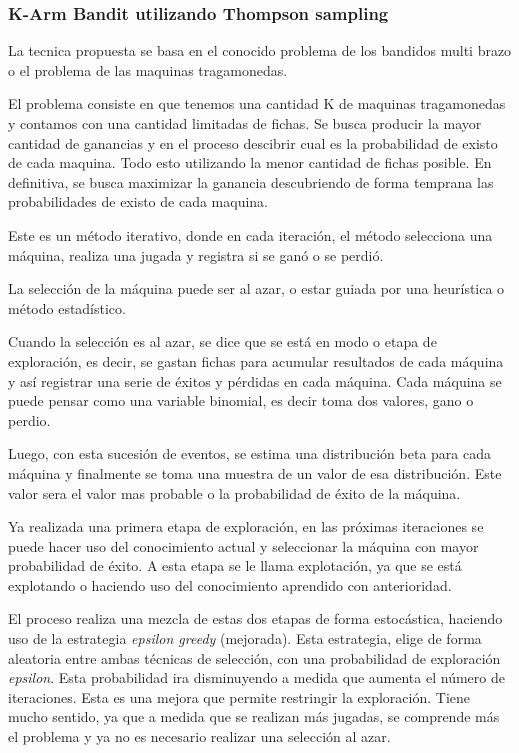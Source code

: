 \documentclass[11pt,a4paper,twoside]{thesis}
\begin{document}
\subsubsection{K-Arm Bandit utilizando Thompson sampling}

La tecnica propuesta se basa en el conocido problema de los bandidos multi
brazo o el problema de las maquinas tragamonedas.

El problema consiste en que tenemos una cantidad K de maquinas tragamonedas y
contamos con una cantidad limitadas de fichas. Se busca producir la mayor
cantidad de ganancias y en el proceso descibrir cual es la probabilidad de
existo de cada maquina. Todo esto utilizando la menor cantidad de fichas
posible. En definitiva, se busca maximizar la ganancia descubriendo de forma
temprana las probabilidades de existo de cada maquina.

Este es un método iterativo, donde en cada iteración, el método selecciona una
máquina, realiza una jugada y registra si se ganó o se perdió.

La selección de la máquina puede ser al azar, o estar guiada por una heurística
o método estadístico.

Cuando la selección es al azar, se dice que se está en modo o etapa de
exploración, es decir, se gastan fichas para acumular resultados de cada
máquina y así registrar una serie de éxitos y pérdidas en cada máquina. Cada
máquina se puede pensar como una variable binomial, es decir toma dos valores,
gano o perdio.

Luego, con esta sucesión de eventos, se estima una distribución beta para cada
máquina y finalmente se toma una muestra de un valor de esa distribución. Este
valor sera el valor mas probable o la probabilidad de éxito de la máquina.

Ya realizada una primera etapa de exploración, en las próximas iteraciones se
puede hacer uso del conocimiento actual y seleccionar la máquina con mayor
probabilidad de éxito. A esta etapa se le llama explotación, ya que se está
explotando o haciendo uso del conocimiento aprendido con anterioridad.

El proceso realiza una mezcla de estas dos etapas de forma estocástica,
haciendo uso de la estrategia \textit{epsilon greedy} (mejorada). Esta
estrategia, elige de forma aleatoria entre ambas técnicas de selección, con una
probabilidad de exploración \textit{epsilon}. Esta probabilidad ira
disminuyendo a medida que aumenta el número de iteraciones. Esta es una mejora
que permite restringir la exploración. Tiene mucho sentido, ya que a medida que
se realizan más jugadas, se comprende más el problema y ya no es necesario
realizar una selección al azar.
\end{document}
